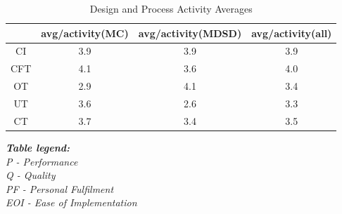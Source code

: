\documentclass[final_report_innit.tex]{subfiles}
\begin{document}
\begin{table}[h]
\caption{Design and Process Activity Averages}
\centering
\begin{tabular}{@{}c|c|c|c|@{}}
\cmidrule(l){2-4}
\multicolumn{1}{l|}{}    & \multicolumn{1}{l|}{avg/activity(MC)} & \multicolumn{1}{l|}{avg/activity(MDSD)} & \multicolumn{1}{l|}{avg/activity(all)} \\ \midrule
\multicolumn{1}{|c|}{CI} & 3.9                                & 3.9                                 & 3.9                                 \\ \midrule
\multicolumn{1}{|c|}{CFT} & 4.1                                & 3.6                                 & 4.0                                 \\ \midrule
\multicolumn{1}{|c|}{OT} & 2.9                                & 4.1                                 & 3.4                                 \\ \midrule
\multicolumn{1}{|c|}{UT} & 3.6                                & 2.6                                 & 3.3                                 \\ \midrule
\multicolumn{1}{|c|}{CT} & 3.7                                & 3.4                                 & 3.5                                 \\ \bottomrule
\end{tabular}
\end{table}

\smallskip
\smallskip
\smallskip
\smallskip
\smallskip
\smallskip


\noindent
\textit{
\textbf{\hspace{12 mm}Table legend:}
\\
\hspace*{13 mm}P - Performance
\\
\hspace*{13 mm}Q - Quality
\\
\hspace*{13 mm}PF - Personal Fulfilment
\\
\hspace*{13 mm}EOI - Ease of Implementation
}
\end{document}
